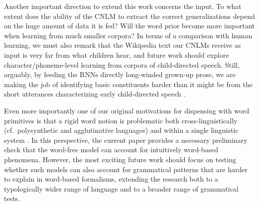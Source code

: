 Another important direction to extend this work concerns the input. To
what extent does the ability of the CNLM to extract the correct
generalizations depend on the huge amount of data it is fed?  Will the
word prior become more important when learning from much smaller
corpora? In terms of a comparison with human learning, we must also
remark that the Wikipedia text our CNLMs receive as input is very far
from what children hear, and future work should explore
character/phoneme-level learning from corpora of child-directed
speech. Still, arguably, by feeding the RNNs directly long-winded
grown-up prose, we are making the job of identifying basic
constituents harder than it might be from the short utterances
characterizing early child-directed speech \cite{Tomasello:2003}.

Even more importantly one of our original motivations for dispensing
with word primitives is that a rigid word notion is problematic both
cross-linguistically (cf.~polysynthetic and agglutinative languages)
and within a single linguistic system \cite[cf.~the common view that
the lexicon hosts units at different levels of the linguistic
hierarchy, from morphemes to large syntactic constructions,
e.g.,]{Jackendoff:1997,Croft:Cruse:2004,Goldberg:2005}. In this
perspective, the current paper provides a necessary preliminary check
that the word-free model can account for intuitively word-based
phenomena. However, the most exciting future work should focus on
testing whether such models can also account for grammatical patterns
that are harder to explain in word-based formalisms, extending the
research both to a typologically wider range of language and to a
broader range of grammatical tests.






